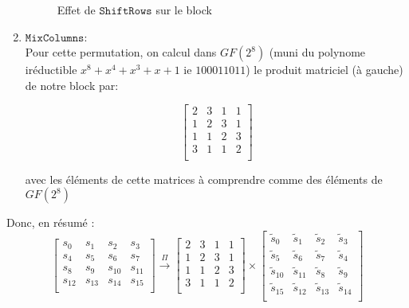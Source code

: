 \documentclass[a4paper, 12pt]{article}
\begin{document}
\begin{enumerate}
\begin{figure}[H]
		\caption{Effet de $\mathtt{ShiftRows}$ sur le block}
		\label{illu_shiftrows}
		\end{figure}

	\item $\mathtt{MixColumns}$: \\
		Pour cette permutation, on calcul dans $GF\left(2^8\right)$ (muni du polynome iréductible $x^8 + x^4 + x^3 + x + 1$ ie $100011011$) le produit matriciel (à gauche) de notre block par:
		
		$$
		\begin{bmatrix}
			2 & 3 & 1 & 1 \\
			1 & 2 & 3 & 1 \\
			1 & 1 & 2 & 3 \\
			3 & 1 & 1 & 2 \\
		\end{bmatrix}
		$$
		
		avec les éléments de cette matrices à comprendre comme des éléments de $GF\left(2^8\right)$ 
\end{enumerate}

\noindent Donc, en résumé : 
$$
\begin{bmatrix}
	s_{0} & s_{1} & s_{2} & s_{3} \\
	s_{4} & s_{5} & s_{6} & s_{7} \\
	s_{8} & s_{9} & s_{10} & s_{11} \\
	s_{12} & s_{13} & s_{14} & s_{15} \\
\end{bmatrix}
\overset{\Pi}{\rightarrow}
\begin{bmatrix}
	2 & 3 & 1 & 1 \\
	1 & 2 & 3 & 1 \\
	1 & 1 & 2 & 3 \\
	3 & 1 & 1 & 2 \\
\end{bmatrix}
\times
\begin{bmatrix}
	\tilde{s}_0 & \tilde{s}_1 & \tilde{s}_2 & \tilde{s}_3 \\
	\tilde{s}_5 & \tilde{s}_6 & \tilde{s}_7 & \tilde{s}_4 \\
	\tilde{s}_{10} & \tilde{s}_{11} & \tilde{s}_8 & \tilde{s}_9 \\
	\tilde{s}_{15} & \tilde{s}_{12} & \tilde{s}_{13} & \tilde{s}_{14} \\
\end{bmatrix}
$$
\end{document}
